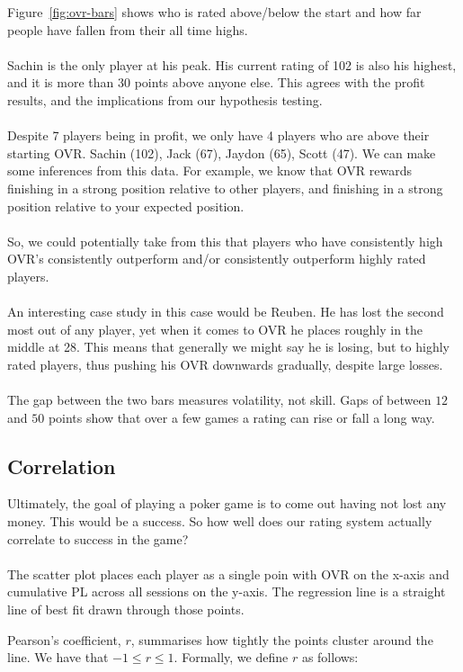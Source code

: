 \documentclass[11pt,a4paper]{article}
\begin{document}
Figure~\ref{fig:ovr-bars} shows who is rated above/below the start and how far people have fallen from their all time highs.\\\\
Sachin is the only player at his peak. His current rating of 102 is also his highest, and it is more than 30 points above anyone else. This agrees with the profit results, and the implications from our hypothesis testing.\\\\
Despite 7 players being in profit, we only have 4 players who are above their starting OVR. Sachin (102), Jack (67), Jaydon (65), Scott (47). We can make some inferences from this data. For example, we know that OVR rewards finishing in a strong position relative to other players, and finishing in a strong position relative to your expected position.\\\\
So, we could potentially take from this that players who have consistently high OVR's consistently outperform and/or consistently outperform highly rated players.\\\\
An interesting case study in this case would be Reuben. He has lost the second most out of any player, yet when it comes to OVR he places roughly in the middle at 28. This means that generally we might say he is losing, but to highly rated players, thus pushing his OVR downwards gradually, despite large losses.\\\\
The gap between the two bars measures volatility, not skill. Gaps of between $12$ and $50$ points show that over a few games a rating can rise or fall a long way.

\newpage

\subsection{Correlation}

Ultimately, the goal of playing a poker game is to come out having not lost any money. This would be a success. So how well does our rating system actually correlate to success in the game?\\\\
The scatter plot places each player as a single poin with OVR on the x-axis and cumulative PL across all sessions on the y-axis. The regression line is a straight line of best fit drawn through those points.

Pearson's coefficient, $r$, summarises how tightly the points cluster around the line. We have that $-1\leq r\leq 1$. Formally, we define $r$ as follows:
\end{document}
